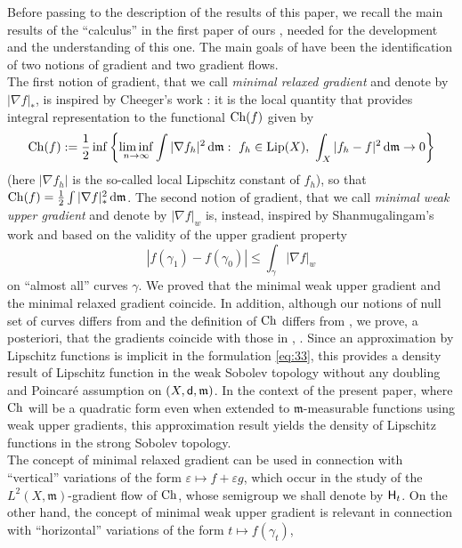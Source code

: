 \documentclass[reqno,11pt]{article}
\numberwithin{equation}{section}
\newcommand{\C}{\mathbb{C}}
\newcommand{\mm}{{\mbox{\boldmath$m$}}}
\newcommand{\sfd}{{\sf d}}
\renewcommand{\d}{{\mathrm d}}
\newcommand{\eps}{\varepsilon}
\newcommand{\relgrad}[1]{|\nabla #1|_*}                     %
\newcommand{\weakgrad}[1]{|\nabla #1|_w}                %
\renewcommand{\C}{{\rm Ch}}
\newcommand{\heatl}{{\sf H}}
\renewcommand{\mm}{\mathfrak m}
\begin{document}
Before passing to the description of the results of this paper, we
recall the main results of the ``calculus'' in the first paper of
ours \cite{Ambrosio-Gigli-Savare11}, needed for the development and
the understanding of this one. The main goals of
\cite{Ambrosio-Gigli-Savare11} have been the identification of two
notions of gradient and two gradient flows. \\ The first notion of
gradient, that we call \emph{minimal relaxed gradient} and denote by
$\relgrad{f}$, is inspired by Cheeger's work \cite{Cheeger00}: it is
the local quantity that provides integral representation to the
functional $\C(f)$ given by
\begin{equation}
\C(f):=\frac 12\inf\left\{\liminf_{n\to\infty}\int|\nabla
f_h|^2\,\d\mm:\ f_h\in {\rm Lip}(X),\,\,\int_X|f_h-f|^2\,\d\mm\to
0\right\}\label{eq:33}
\end{equation}
(here $|\nabla f_h|$ is the so-called local Lipschitz constant of
$f_h$), so that $\C(f)=\tfrac12\int\relgrad{f}^2\,\d\mm$. The second
notion of gradient, that we call \emph{minimal weak upper gradient}
and denote by $\weakgrad{f}$ is, instead, inspired by
Shanmugalingam's work \cite{Shanmugalingam00} and based on the
validity of the upper gradient property
$$
|f(\gamma_1)-f(\gamma_0)|\leq\int_\gamma\weakgrad{f}
$$
on ``almost all'' curves $\gamma$. We proved that the minimal weak
upper gradient and the minimal relaxed gradient coincide. In
addition, although our notions of null set of curves differs from
\cite{Shanmugalingam00} and the definition of $\C$ differs from
\cite{Cheeger00}, we prove, a posteriori, that the gradients
coincide with those in \cite{Cheeger00}, \cite{Shanmugalingam00}.
Since an approximation by Lipschitz functions is implicit in the
formulation \eqref{eq:33}, this provides a density result of
Lipschitz function in the weak Sobolev topology without any doubling
and Poincar\'e assumption on $(X,\sfd,\mm)$. In the context of the
present paper, where $\C$ will be a quadratic form even when
extended to $\mm$-measurable functions using weak upper gradients,
this approximation result yields
the density of Lipschitz functions in the strong Sobolev topology.\\
The concept of minimal relaxed gradient can be used in connection
with ``vertical'' variations of the form $\eps\mapsto f+\eps g$,
which occur in the study of the $L^2(X,\mm)$-gradient flow of $\C$,
whose semigroup we shall denote by $\heatl_t$. On the other hand,
the concept of minimal weak upper gradient is relevant in connection
with ``horizontal'' variations of the form $t\mapsto f(\gamma_t)$,
\end{document}
